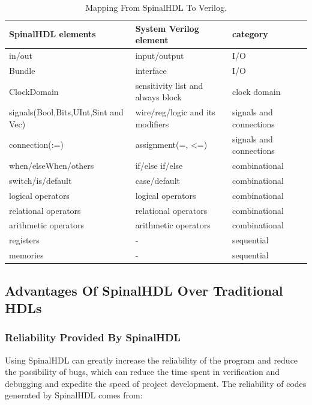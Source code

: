 \documentclass{article}
\begin{document}
\begin{table}[hbt]
\centering
\begin{tabular}{l|l|l}
SpinalHDL elements                      & System Verilog element           & category                \\\hline
in/out                               & input/output                      & I/O                     \\
Bundle                               & interface                         & I/O                     \\
ClockDomain                          & sensitivity list and always block & clock domain            \\
signals(Bool,Bits,UInt,Sint and Vec) & wire/reg/logic and its modifiers  & signals and connections \\
connection(:=)                       & assignment(=, \textless{}=)       & signals and connections \\
when/elseWhen/others                 & if/else if/else                   & combinational           \\
switch/is/default                    & case/default                      & combinational           \\
logical operators                    & logical operators                 & combinational           \\
relational operators                 & relational operators              & combinational           \\
arithmetic operators                 & arithmetic operators              & combinational           \\
registers                            & -                                 & sequential              \\
memories                             & -                                 & sequential             
\end{tabular}
\caption{\label{tab:widgets}Mapping From SpinalHDL To Verilog.}
\end{table}


\subsection{Advantages Of SpinalHDL Over Traditional HDLs}
\subsubsection{Reliability Provided By SpinalHDL}
Using SpinalHDL can greatly increase the reliability of the program and reduce the possibility of bugs, which can reduce the time spent in verification and debugging and expedite the speed of project development. The reliability of codes generated by SpinalHDL comes from:
\end{document}
